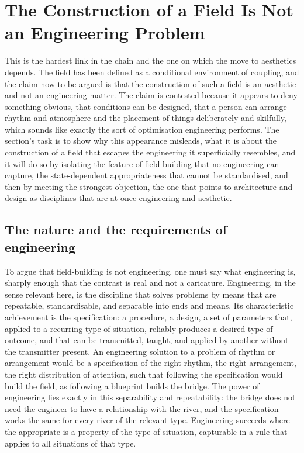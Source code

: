 \section{The Construction of a Field Is Not an Engineering Problem}
\label{p22:sec:not-engineering}

\noindent
This is the hardest link in the chain and the one on which the move to aesthetics depends. The field has been defined as a conditional environment of coupling, and the claim now to be argued is that the construction of such a field is an aesthetic and not an engineering matter. The claim is contested because it appears to deny something obvious, that conditions can be designed, that a person can arrange rhythm and atmosphere and the placement of things deliberately and skilfully, which sounds like exactly the sort of optimisation engineering performs. The section's task is to show why this appearance misleads, what it is about the construction of a field that escapes the engineering it superficially resembles, and it will do so by isolating the feature of field-building that no engineering can capture, the state-dependent appropriateness that cannot be standardised, and then by meeting the strongest objection, the one that points to architecture and design as disciplines that are at once engineering and aesthetic.

\subsection{The nature and the requirements of engineering}
\label{p22:sub:eng-what}

To argue that field-building is not engineering, one must say what engineering is, sharply enough that the contrast is real and not a caricature. Engineering, in the sense relevant here, is the discipline that solves problems by means that are repeatable, standardisable, and separable into ends and means. Its characteristic achievement is the specification: a procedure, a design, a set of parameters that, applied to a recurring type of situation, reliably produces a desired type of outcome, and that can be transmitted, taught, and applied by another without the transmitter present. An engineering solution to a problem of rhythm or arrangement would be a specification of the right rhythm, the right arrangement, the right distribution of attention, such that following the specification would build the field, as following a blueprint builds the bridge. The power of engineering lies exactly in this separability and repeatability: the bridge does not need the engineer to have a relationship with the river, and the specification works the same for every river of the relevant type. Engineering succeeds where the appropriate is a property of the type of situation, capturable in a rule that applies to all situations of that type.


